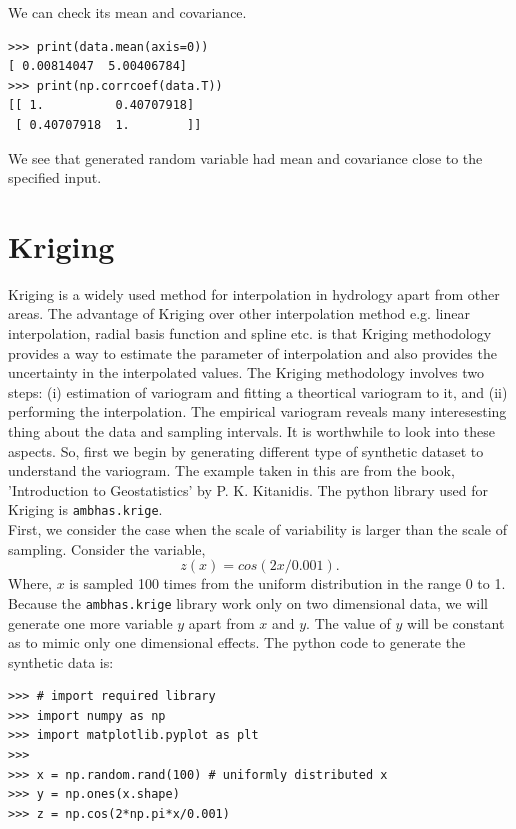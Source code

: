 \documentclass[10pt]{book}
\begin{document}
{We can check its mean and covariance.
\beforeverb \begin{verbatim}
>>> print(data.mean(axis=0))
[ 0.00814047  5.00406784]
>>> print(np.corrcoef(data.T))
[[ 1.          0.40707918]
 [ 0.40707918  1.        ]]
\end{verbatim} \afterverb
We see that generated random variable had mean and covariance close to the specified input. 


\section{Kriging}
Kriging is a widely used method for interpolation in hydrology apart from other areas. The advantage of Kriging over other interpolation method e.g. linear interpolation, radial basis function and  spline etc. is that Kriging methodology provides a way to estimate the parameter of interpolation and also provides the uncertainty in the interpolated values. The Kriging methodology involves two steps: (i) estimation of variogram and fitting a theortical variogram to it, and (ii) performing the interpolation. The empirical variogram reveals many interesesting thing about the data and sampling intervals. It is worthwhile to look into these aspects. So, first we begin by generating different type of synthetic dataset to understand the variogram. The example taken in this are from the book, 'Introduction to Geostatistics' by P. K. Kitanidis. The python library used for Kriging is \verb"ambhas.krige".\\

First, we consider the case when the scale of variability is larger than the scale of sampling. Consider the variable,
\begin{equation}
z(x) = cos(2 x/0.001).
\end{equation}
Where, $x$ is sampled 100 times from the uniform distribution in the range 0 to 1. Because the \verb"ambhas.krige" library work only on two dimensional data, we will generate one more variable $y$ apart from $x$ and $y$. The value of $y$ will be constant as to mimic only one dimensional effects. The python code to generate the synthetic data is:

\beforeverb \begin{verbatim}
>>> # import required library
>>> import numpy as np
>>> import matplotlib.pyplot as plt
>>> 
>>> x = np.random.rand(100) # uniformly distributed x
>>> y = np.ones(x.shape) 
>>> z = np.cos(2*np.pi*x/0.001) 
\end{verbatim} \afterverb

}
\end{document}
